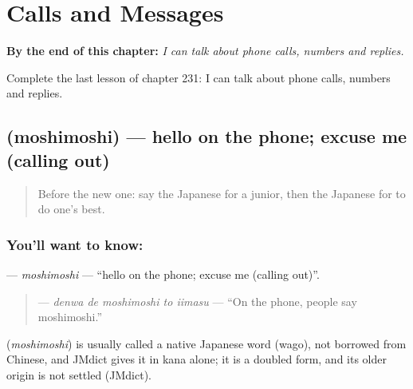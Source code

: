 
\chapter{Calls and Messages}
\label{ch:ja-calls-and-messages}

\begin{chapteropening}
\textbf{By the end of this chapter:} \emph{I can talk about phone calls, numbers and replies.}

Complete the last lesson of chapter 231: I can talk about phone calls, numbers and replies.
\end{chapteropening}

\section[\texorpdfstring{\ja{もしもし} (moshimoshi)}{もしもし (moshimoshi)}]{ (moshimoshi) — hello on the phone; excuse me (calling out)}

\label{lesson:JA-C231-moshimoshi}



\begin{quote}
Before the new one: say the Japanese for a junior, then the Japanese for to do one's best.
\end{quote}

\subsection*{You'll want to know: }
\textbf{} — \emph{moshimoshi} — \textquotedblleft{}hello on the phone; excuse me (calling out)\textquotedblright{}.

\begin{quote}
\textbf{  } — \emph{denwa de moshimoshi to iimasu} — \textquotedblleft{}On the phone, people say moshimoshi.\textquotedblright{}
\end{quote}

\begin{cousinweb}
\textbf{} (\emph{moshimoshi}) is usually called a native Japanese word (wago), not borrowed from Chinese, and JMdict gives it in kana alone; it is a doubled form, and its older origin is not settled (JMdict).
\end{cousinweb}

